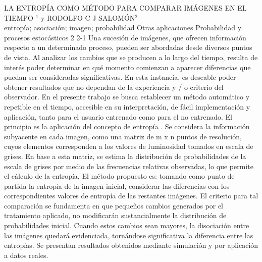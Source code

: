 \A
{LA ENTROPÍA COMO MÉTODO PARA COMPARAR IMÁGENES EN EL TIEMPO}
{$^1$ y RODOLFO C J SALOMÓN$^2$}
{
\\}
{entropía; asociación; imagen; probabilidad} 
 {Otras aplicaciones} 
 {Probabilidad y procesos estocásticos} 
 {2} 
 {2-1}
{Una sucesión de imágenes, que ofrecen información respecto a un determinado proceso, pueden ser abordadas desde diversos puntos de vista. Al analizar los cambios que se producen a lo largo del tiempo, resulta de interés poder determinar en qué momento comienzan a aparecer diferencias que puedan ser consideradas significativas. En esta instancia, es deseable poder obtener resultados que no dependan de la experiencia y / o criterio del observador. En el presente trabajo se busca establecer un método automático y repetible en el tiempo, accesible en su interpretación, de fácil implementación y aplicación, tanto para el usuario entrenado como para el no entrenado. El principio es la aplicación del concepto de entropía . Se considera la información subyacente en cada imagen, como una matriz de m x n puntos de resolución, cuyos elementos corresponden a los valores de luminosidad tomados en escala de grises. En base a esta matriz, se estima la distribución de probabilidades de la escala de grises por medio de las frecuencias relativas observadas, lo que permite el cálculo de la entropía. El método propuesto es: tomando como punto de partida la entropía de la imagen inicial, considerar las diferencias con los correspondientes valores de entropía de las restantes imágenes. El criterio para tal comparación se fundamenta en que pequeños cambios generados por el tratamiento aplicado, no modificarán sustancialmente la distribución de probabilidades inicial. Cuando estos cambios sean mayores, la disociación entre las imágenes quedará evidenciada, tornándose significativa la diferencia entre las entropías. Se presentan resultados obtenidos mediante simulación y por aplicación a datos reales. }
